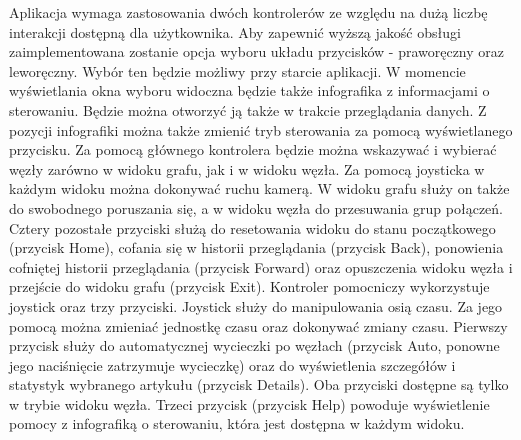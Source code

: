 Aplikacja wymaga zastosowania dwóch kontrolerów ze względu na dużą liczbę interakcji dostępną dla użytkownika. Aby zapewnić wyższą jakość obsługi zaimplementowana zostanie opcja wyboru układu przycisków - praworęczny oraz leworęczny. Wybór ten będzie możliwy przy starcie aplikacji. W momencie wyświetlania okna wyboru widoczna będzie także infografika z informacjami o sterowaniu. Będzie można  otworzyć ją także w trakcie przeglądania danych. Z pozycji infografiki można także zmienić tryb sterowania za pomocą wyświetlanego przycisku.
Za pomocą głównego kontrolera będzie można wskazywać i wybierać węzły zarówno w widoku grafu, jak i w widoku węzła. Za pomocą joysticka w każdym widoku można dokonywać ruchu kamerą. W widoku grafu służy on także do swobodnego poruszania się, a w widoku węzła do przesuwania grup połączeń. Cztery pozostałe przyciski służą do resetowania widoku do stanu początkowego (przycisk Home), cofania się w historii przeglądania (przycisk Back), ponowienia cofniętej historii przeglądania (przycisk Forward) oraz opuszczenia widoku węzła i przejście do widoku grafu (przycisk Exit). 
Kontroler pomocniczy wykorzystuje joystick oraz trzy przyciski. Joystick służy do manipulowania osią czasu. Za jego pomocą można zmieniać jednostkę czasu oraz dokonywać zmiany czasu. Pierwszy przycisk służy do automatycznej wycieczki po węzłach (przycisk Auto, ponowne jego naciśnięcie zatrzymuje wycieczkę) oraz do wyświetlenia szczegółów i statystyk wybranego artykułu (przycisk Details). Oba przyciski dostępne są tylko w trybie widoku węzła. Trzeci przycisk (przycisk Help) powoduje wyświetlenie pomocy z infografiką o sterowaniu, która jest dostępna w każdym widoku.
